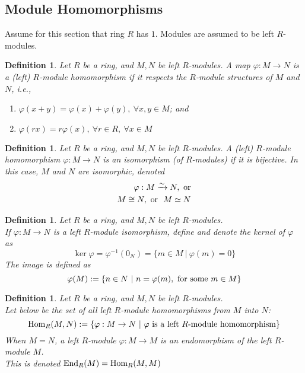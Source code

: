\documentclass[a4paper,8pt]{article}
\newcommand{\isomorp}{\xrightarrow{\sim}}
\newcommand{\hlt}[1]{\textit{{\color{blue}#1}}}
\newcommand{\homs}[1]{\textnormal{Hom}#1}
\theoremstyle{theorem}
\newtheorem{definition}[theorem]{Definition}
\begin{document}
\subsection{Module Homomorphisms}

Assume for this section that ring $R$ has $1$. Modules are assumed to be left $R$-modules.

\begin{definition}
Let $R$ be a ring, and $M, N$ be left $R$-modules. A map $\varphi: M \rightarrow N$ is a (left) $R$-module homomorphism if it respects the $R$-module structures of $M$ and $N$, i.e.,
\begin{enumerate}[label=(\roman*)]
\item $\varphi(x+y) = \varphi(x) + \varphi(y), \ \forall x,y \in M$; and
\item $\varphi(rx) = r \varphi(x), \ \forall r \in R, \ \forall x \in M$	
\end{enumerate}
\end{definition}

\begin{definition}
Let $R$ be a ring, and $M, N$ be left $R$-modules. A (left) $R$-module homomorphism $\varphi: M \rightarrow N$ is an isomorphism (of $R$-modules) if it is bijective. In this case, $M$ and $N$ are \hlt{isomorphic}, denoted
\begin{align}
\varphi : M \isomorp N, \textnormal{ or} \nonumber \\
M \cong N, \textnormal{ or } \ M \simeq N \nonumber
\end{align}
\end{definition}

\begin{definition}
Let $R$ be a ring, and $M, N$ be left $R$-modules.\\
If $\varphi: M \rightarrow N$ is a left $R$-module isomorphism, define and denote the \hlt{kernel of $\varphi$} as
\begin{equation}
\ker \varphi = \varphi^{-1}(0_N) = \{m \in M \ | \ \varphi(m) = 0\} \nonumber
\end{equation}
The \hlt{image} is defined as
\begin{equation}
\varphi(M) := \{n \in N \ | \ n = \varphi(m), \textnormal{ for some } m \in M\} \nonumber
\end{equation}
\end{definition}

\begin{definition}
Let $R$ be a ring, and $M, N$ be left $R$-modules.\\
Let below be the set of all left $R$-module homomorphisms from $M$ into $N$:
\begin{equation}
\homs_R (M,N) := \{\varphi: M \rightarrow N \ | \ \varphi \textnormal{ is a left $R$-module homomorphism}\} \nonumber
\end{equation}
When $M=N$, a left $R$-module $\varphi: M \rightarrow M$ is an \hlt{endomorphism} of the left $R$-module $M$.\\
This is denoted $\textnormal{End}_R (M) = \homs_R(M,M)$
\end{definition}
\end{document}

